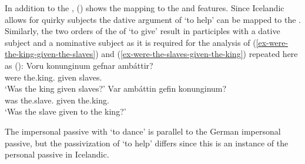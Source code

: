 \ea\label{da-repr-hm-Icelandic-two}%
\z
In addition to the \argstl, () shows the mapping to the \spr and \comps features. Since
Icelandic allows for quirky subjects the dative argument of `to help' can be mapped to the
\sprl \citep[--148]{Wechsler95a-u}. Similarly, the two orders of the \argst of `to give' result in participles with a dative
subject and a nominative subject as it is required for the analysis of (\ref{ex-were-the-king-given-the-slaves}) and (\ref{ex-were-the-slaves-given-the-king}) repeated
here as ():
\eal
\ex\label{ex-were-the-king-given-the-slaves-two}
\gll Voru konunginum gefnar ambáttir?\\
     were the.king.\DAT{} given slaves.\NOM{}\\
\glt `Was the king given slaves?'
\ex\label{ex-were-the-slaves-given-the-king-two}
\gll Var ambáttin gefin konunginum?\\
     was the.slave.\NOM{} given the.king.\DAT\\
\glt `Was the slave given to the king?'
\zl

\noindent
The impersonal passive with `to dance' is parallel to the German impersonal passive, but the
passivization of `to help' differs since this is an instance of the personal passive in Icelandic.


